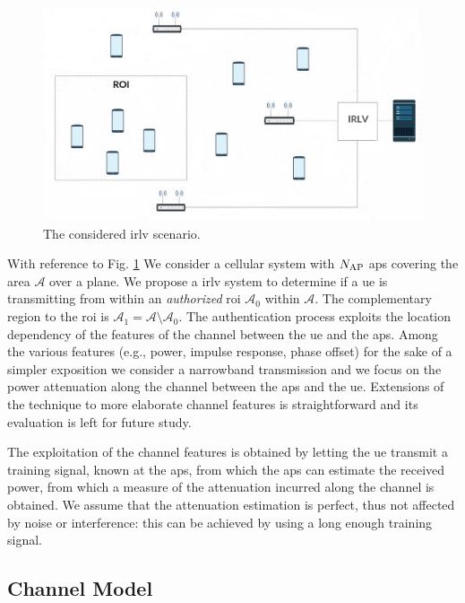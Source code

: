 \documentclass[draftcls,onecolumn,12pt]{IEEEtran}
\begin{document}
\begin{figure}
    \centering
    \includegraphics[width=0.8\columnwidth]{irlv.JPG}
    \caption{The considered \ac{irlv} scenario.}
    \label{fig1}
\end{figure}

With reference to Fig. \ref{fig1} We consider a cellular system with $N_{\rm AP}$ \acp{ap} covering the area $\mathcal{A}$ over a plane. We propose a \ac{irlv} system to determine if a \ac{ue} is transmitting from within an {\em authorized} \ac{roi} $\mathcal{A}_0$ within   $\mathcal{A}$. The complementary region to the \ac{roi} is  $\mathcal{A}_1=\mathcal{A} \setminus \mathcal{A}_0$. The authentication process exploits the location dependency of the features of the channel between the \ac{ue} and the \acp{ap}.  Among the various features (e.g., power, impulse response, phase offset) for the sake of a simpler exposition we consider a narrowband transmission and we focus on the power attenuation along the channel between the  \acp{ap} and the \ac{ue}. Extensions of the technique to more elaborate channel features is straightforward and its evaluation is left for future study.

The exploitation of the channel features is obtained by letting the \ac{ue} transmit a training signal, known at the \acp{ap}, from which the \acp{ap} can estimate the received power, from which a measure of the attenuation incurred along the channel is obtained. We assume that the attenuation estimation is perfect, thus not affected by noise or interference: this can be achieved by using a long enough training signal.




\subsection{Channel Model}
\end{document}
